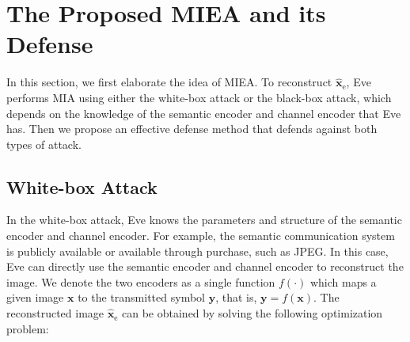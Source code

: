 \documentclass[conference]{IEEEtran}
\begin{document}

\section{The Proposed MIEA and its Defense}
\label{sec miea}
In this section, we first elaborate the idea of MIEA. To reconstruct $\hat{\boldsymbol{x}}_{\mathrm{e}}$, Eve performs MIA\cite{he2020attacking} using either the white-box attack or the black-box attack, which depends on the knowledge of the semantic encoder and channel encoder that Eve has. Then we propose an effective defense method that defends against both types of attack.

\subsection{White-box Attack} 
\label{sec wb-mia}
In the white-box attack, Eve knows the parameters and structure of the semantic encoder and channel encoder. For example, the semantic communication system is publicly available or available through purchase, such as JPEG. In this case, Eve can directly use the semantic encoder and channel encoder to reconstruct the image. We denote the two encoders as a single function $f(\cdot)$ which maps a given image $\boldsymbol{x}$ to the transmitted symbol $\boldsymbol{y}$, that is, $\boldsymbol{y} = f(\boldsymbol{x})$. The reconstructed image $\hat{\boldsymbol{x}}_\mathrm{e}$ can be obtained by solving the following optimization problem:
\end{document}
